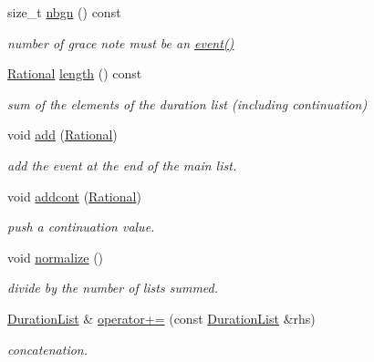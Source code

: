 \begin{DoxyCompactItemize}
size\+\_\+t \mbox{\hyperlink{group__output_ga72427605bbceabff329459a610db1201}{nbgn}} () const
\begin{DoxyCompactList}\small\item\em number of grace note must be an \mbox{\hyperlink{group__output_gadd91aa5ec57a51c6253ea872eadb28dc}{event()}} \end{DoxyCompactList}\item 
\mbox{\hyperlink{classRational}{Rational}} \mbox{\hyperlink{group__output_ga540cf8decb4f62a80e871ab1e6dd31de}{length}} () const
\begin{DoxyCompactList}\small\item\em sum of the elements of the duration list (including continuation) \end{DoxyCompactList}\item 
void \mbox{\hyperlink{group__output_gaddb48455388f36f48ace0f0c0b250105}{add}} (\mbox{\hyperlink{classRational}{Rational}})
\begin{DoxyCompactList}\small\item\em add the event at the end of the main list. \end{DoxyCompactList}\item 
void \mbox{\hyperlink{group__output_gab9d508060073c83c27e13f8f2472de38}{addcont}} (\mbox{\hyperlink{classRational}{Rational}})
\begin{DoxyCompactList}\small\item\em push a continuation value. \end{DoxyCompactList}\item 
void \mbox{\hyperlink{group__output_ga20a55c27bcb4ec4f639d4f7f79153be5}{normalize}} ()
\begin{DoxyCompactList}\small\item\em divide by the number of lists summed. \end{DoxyCompactList}\item 
\mbox{\hyperlink{classDurationList}{Duration\+List}} \& \mbox{\hyperlink{group__output_ga06ae4f865c1c27edd490f1631d76452a}{operator+=}} (const \mbox{\hyperlink{classDurationList}{Duration\+List}} \&rhs)
\begin{DoxyCompactList}\small\item\em concatenation. \end{DoxyCompactList}\end{DoxyCompactItemize}
